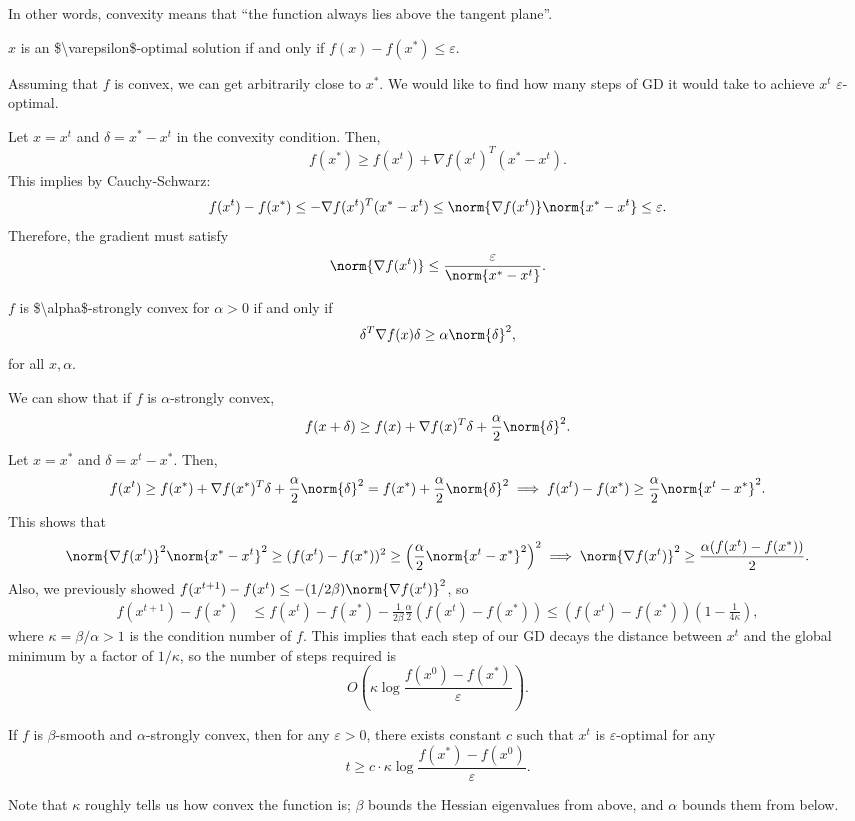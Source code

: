 In other words, convexity means that ``the function always lies above the tangent plane''. 

\begin{definition}

$x$ is an \ac{$\varepsilon$-optimal} solution if and only if $f(x)-f(x^*)\leq \varepsilon$. 
\end{definition}

Assuming that $f$ is convex, we can get arbitrarily close to $x^*$. We would like to find how many steps of GD it would take to achieve $x^t$ $\varepsilon$-optimal.

Let $x=x^t$ and $\delta = x^*-x^t$ in the convexity condition. Then, 
\[f(x^*) \geq f(x^t) + \nabla f(x^t)^T(x^*-x^t).\]
This implies by Cauchy-Schwarz:
\[f(x^t)-f(x^*) \leq -\nabla f(x^t)^T(x^*-x^t) \leq \norm{\nabla f(x^t)}\norm{x^*-x^t}\leq \varepsilon.\]
Therefore, the gradient must satisfy 
\[\norm{\nabla f(x^t)} \leq \frac{\varepsilon}{\norm{x^*-x^t}}.\]
\begin{definition}

$f$ is \ac{$\alpha$-strongly convex} for $\alpha>0$ if and only if 
\[\delta^T\nabla f(x)\delta \geq \alpha \norm{\delta}^2,\]
for all $x,\alpha$.
\end{definition}

We can show that if $f$ is $\alpha$-strongly convex, 
\[f(x+\delta)\geq f(x) + \nabla f(x)^T\delta + \frac{\alpha}{2}\norm{\delta}^2.\]
Let $x=x^*$ and $\delta = x^t-x^*$. Then, 
\[f(x^t)\geq f(x^*) + \nabla f(x^*)^T\delta + \frac{\alpha}{2}\norm{\delta}^2 = f(x^*) + 
\frac{\alpha}{2}\norm{\delta}^2\implies f(x^t)-f(x^*)\geq \frac{\alpha}{2}\norm{x^t-x^*}^2.\]
This shows that 
\[\norm{\nabla f(x^t)}^2\norm{x^*-x^t}^2\geq (f(x^t)-f(x^*))^2 \geq \left(\frac{\alpha}{2}\norm{x^t-x^*}^2\right)^2\implies \norm{\nabla f(x^t)}^2 \geq \frac{\alpha (f(x^t) - f(x^*))}{2}.\]
Also, we previously showed $f(x^{t+1})-f(x^{t})\leq -(1/2\beta)\norm{\nabla f(x^t)}^2$, so 
\begin{align*}
    f(x^{t+1})-f(x^*) &\leq f(x^t)-f(x^*)-\frac{1}{2\beta}\frac{\alpha}{2}(f(x^t)-f(x^*))\leq (f(x^t)-f(x^*))\left(1-\frac{1}{4\kappa}\right),
\end{align*}
where $\kappa = \beta/\alpha > 1$ is the \ac{condition number} of $f$. This implies that each step of our GD decays the distance between $x^t$ and the global minimum by a factor of $1/\kappa$, so the number of steps required is 
\[O\left(\kappa \log \frac{f(x^0)-f(x^*)}{\varepsilon}\right).\]

\begin{theorem}
\thmlabel

If $f$ is $\beta$-smooth and $\alpha$-strongly convex, then for any $\varepsilon > 0$, there exists constant $c$ such that $x^t$ is $\varepsilon$-optimal for any 
\[t\geq c\cdot \kappa\log\frac{f(x^*)-f(x^0)}{\varepsilon}.\]
\end{theorem}

Note that $\kappa$ roughly tells us how convex the function is; $\beta$ bounds the Hessian eigenvalues from above, and $\alpha$ bounds them from below. 